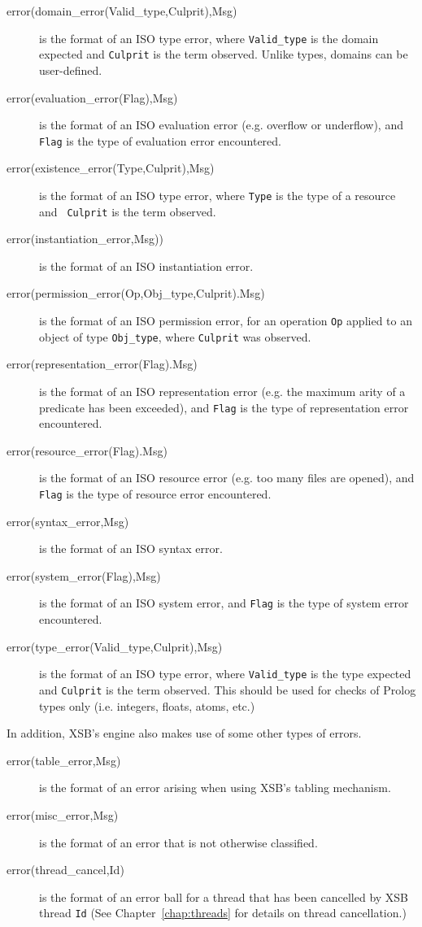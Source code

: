 \begin{description}
\item [error(domain\_error(Valid\_type,Culprit),Msg)] is the format of
  an ISO type error, where {\tt Valid\_type} is the domain expected
  and {\tt Culprit} is the term observed.  Unlike types, domains can
  be user-defined.
%
\item[error(evaluation\_error(Flag),Msg)] is the format of an ISO
  evaluation error (e.g. overflow or underflow), and {\tt Flag} is the
  type of evaluation error encountered.
%
\item [error(existence\_error(Type,Culprit),Msg)] is the format of an
  ISO type error, where {\tt Type} is the type of a resource and {\tt
    Culprit} is the term observed.
%
\item[error(instantiation\_error,Msg))] is the format of an ISO
  instantiation error.
%
\item [error(permission\_error(Op,Obj\_type,Culprit).Msg)] is the format of
  an ISO permission error, for an operation {\tt Op} applied to an
  object of type {\tt Obj\_type}, where {\tt Culprit} was observed.
%
\item[error(representation\_error(Flag).Msg)] is the format of an ISO
  representation error (e.g. the maximum arity of a predicate has been
  exceeded), and {\tt Flag} is the type of representation error
  encountered.
%
\item[error(resource\_error(Flag).Msg)] is the format of an ISO
  resource error (e.g. too many files are opened), and {\tt Flag} is
  the type of resource error encountered.
%
\item[error(syntax\_error,Msg)] is the format of an ISO syntax error.
%
\item[error(system\_error(Flag),Msg)] is the format of an ISO system error,
  and {\tt Flag} is the type of system error encountered.
%
\item[error(type\_error(Valid\_type,Culprit),Msg)] is the format of an
  ISO type error, where {\tt Valid\_type} is the type expected and
  {\tt Culprit} is the term observed.  This should be used for checks
  of Prolog types only (i.e. integers, floats, atoms, etc.)
%
\end{description}

In addition, XSB's engine also makes use of some other types of
errors.
%
\begin{description}
\item[error(table\_error,Msg)] is the format of an error arising when
  using XSB's tabling mechanism.
%
\item[error(misc\_error,Msg)] is the format of an error that is not
  otherwise classified.
%
\item[error(thread\_cancel,Id)] is the format of an error ball for a
  thread that has been cancelled by XSB thread {\tt Id} (See
  Chapter~\ref{chap:threads} for details on thread cancellation.)
%
\end{description}

